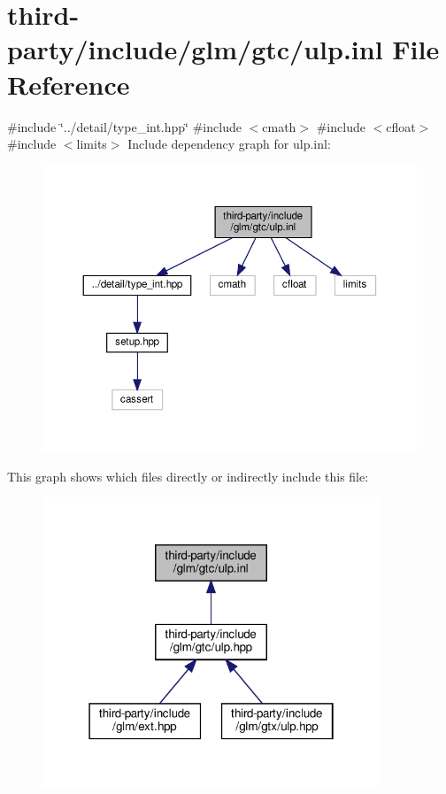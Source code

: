 \hypertarget{ulp_8inl}{}\section{third-\/party/include/glm/gtc/ulp.inl File Reference}
\label{ulp_8inl}
{\ttfamily \#include \char`\"{}../detail/type\+\_\+int.\+hpp\char`\"{}}\newline
{\ttfamily \#include $<$cmath$>$}\newline
{\ttfamily \#include $<$cfloat$>$}\newline
{\ttfamily \#include $<$limits$>$}\newline
Include dependency graph for ulp.\+inl\+:
\nopagebreak
\begin{figure}[H]
\begin{center}
\leavevmode
\includegraphics[width=350pt]{ulp_8inl__incl}
\end{center}
\end{figure}
This graph shows which files directly or indirectly include this file\+:
\nopagebreak
\begin{figure}[H]
\begin{center}
\leavevmode
\includegraphics[width=286pt]{ulp_8inl__dep__incl}
\end{center}
\end{figure}

